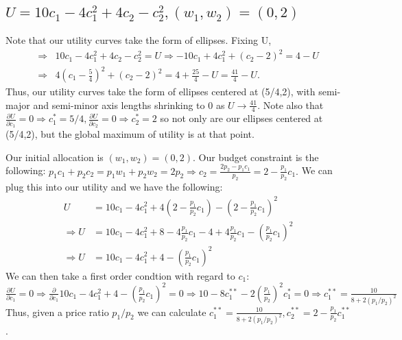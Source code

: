 \documentclass[11pt]{article} %
\begin{document}
\subsection{$U = 10 c_1 - 4 c_{1}^2 + 4c_2 - c_{2}^2, (w_1,w_2) = (0,2)$}
%
Note that our utility curves take the form of ellipses. Fixing U,
\begin{align*}
\Rightarrow& 10 c_1 - 4 c_{1}^2 + 4c_2 - c_{2}^2 = U \Rightarrow -10 c_1 + 4 c_{1}^2 + (c_2 - 2)^2 = 4-U \\
\Rightarrow& 4\left(c_1 - \frac{5}{4}\right)^2 +  (c_2 - 2)^2 = 4 + \frac{25}{4} - U = \frac{41}{4} - U.
\end{align*}
Thus, our utility curves take the form of ellipses centered at (5/4,2), with semi-major and semi-minor axis lengths shrinking to 0 as $U \rightarrow \frac{41}{4}$. Note also that $\frac{\partial U}{\partial c_1} = 0 \Rightarrow c_1^{*} = 5/4, \frac{\partial U}{\partial c_2} = 0 \Rightarrow c_2^{*} = 2$ so not only are our ellipses centered at  (5/4,2), but the global maximum of utility is at that point.

Our initial allocation is $ (w_1,w_2) = (0,2).$ Our budget constraint is the following: $p_1 c_1 + p_2 c_2 = p_1 w_1 + p_2 w_2 = 2p_2 \Rightarrow c_2 = \frac{2p_2 - p_1 c_1}{p_2} = 2 - \frac{p_1}{p_2}c_1.$ We can plug this into our utility and we have the following:
\begin{align*}
U &= 10c_1 - 4c_1^2 + 4\left(2 -  \frac{p_1}{p_2}c_1 \right)- \left(2 -  \frac{p_1}{p_2}c_1 \right)^2 \\
\Rightarrow U &= 10c_1 - 4c_1^2 + 8 - 4\frac{p_1}{p_2}c_1 - 4 + 4\frac{p_1}{p_2}c_1 - \left( \frac{p_1}{p_2}c_1 \right)^2 \\
\Rightarrow U &= 10c_1 - 4c_1^2 + 4 - \left( \frac{p_1}{p_2}c_1 \right)^2
\end{align*}
We can then take a first order condtion with regard to $c_1$: $\frac{\partial U}{\partial c_1} = 0 \Rightarrow \frac{\partial}{\partial c_1} 10c_1 - 4c_1^2 + 4 - \left( \frac{p_1}{p_2}c_1 \right)^2 = 0 \Rightarrow 10 - 8c_1^{**} - 2 \left(\frac{p_1}{p_2}\right)^2c_1^{*} = 0 \Rightarrow c_1^{**} = \frac{10}{8 + 2(p_1/p_2)^2}$
Thus, given a price ratio $p_1/p_2$ we can calculate $c_1^{**} = \frac{10}{8 + 2(p_1/p_2)^2}, c_2^{**} = 2 - \frac{p_1}{p_2}c_1^{**}$.
\end{document}
